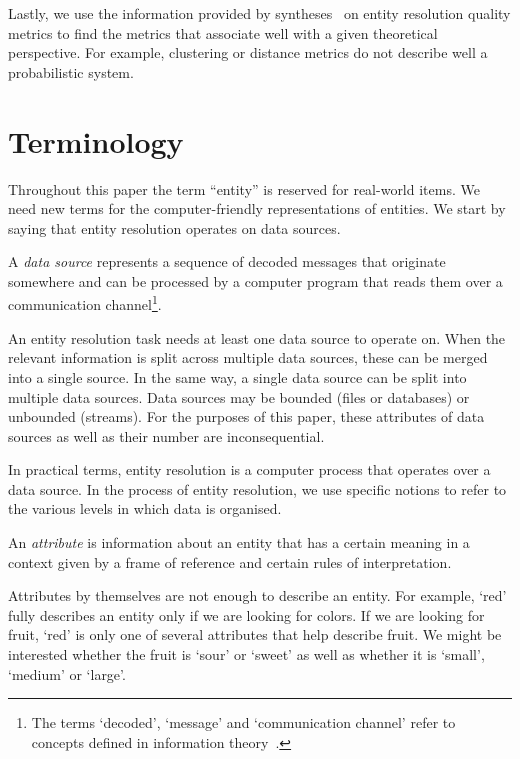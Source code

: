 \documentclass[journal]{IEEEtran}
\begin{document}
    Lastly, we use the information provided by syntheses~\cite{hitesh2012} on
    entity resolution quality metrics to find the metrics that associate well
    with a given theoretical perspective.
    For example, clustering or distance metrics do not describe well a
    probabilistic system.

    \section{Terminology}\label{sec:terminology}

    Throughout this paper the term ``entity'' is reserved for real-world items.
    We need new terms for the computer-friendly representations of entities.
    We start by saying that entity resolution operates on data sources.

    \begin{defn}
        A \textit{data source} represents a sequence of decoded messages
        that originate somewhere and can be processed by a computer program that
        reads them over a communication channel\footnote{The terms `decoded', `message' and `communication channel' refer to concepts
        defined in information theory~\cite{ash2012it}.}.
    \end{defn}

    
    
    An entity resolution task needs at least one data source to operate on.
    When the relevant information is split across multiple data sources, these
    can be merged into a single source.
    In the same way, a single data source can be split into multiple data
    sources.
    Data sources may be bounded (files or databases) or unbounded (streams).
    For the purposes of this paper, these attributes of data sources as well as
    their number are inconsequential.
    
    In practical terms, entity resolution is a computer process that operates
    over a data source.
    In the process of entity resolution, we use specific notions to refer to the
    various levels in which data is organised.

    \begin{defn}
        An \textit{attribute} is information about an entity that has a certain
        meaning in a context given by a frame of reference and certain rules of
        interpretation.
    \end{defn}

    Attributes by themselves are not enough to describe an entity.
    For example, `red' fully describes an entity only if we are looking for
    colors.
    If we are looking for fruit, `red' is only one of several attributes that
    help describe fruit.
    We might be interested whether the fruit is `sour' or `sweet' as well as
    whether it is `small', `medium' or `large'.
\end{document}
